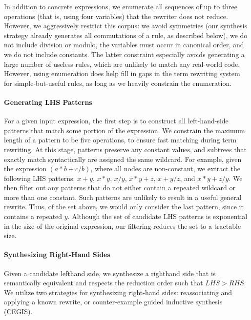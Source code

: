 \documentclass[sigplan,10pt,review,anonymous]{acmart}\settopmatter{printfolios=true,printccs=false,printacmref=false}
\begin{document}
In addition to concrete expressions, we enumerate all sequences of up to three operations (that is,
using four variables) that the rewriter does not reduce.  However, we aggressively restrict
this corpus: we avoid symmetries (our synthesis strategy already generates all commutations
of a rule, as described below), we do not include division or modulo, the variables must occur
in canonical order, and we do not include constants. The latter constraint
especially avoids generating a large number of useless rules, which are unlikely to
match any real-world code. However, using enumeration does help fill in gaps in the term
rewriting system for simple-but-useful rules, as long as we heavily constrain the enumeration.

\paragraph{Generating LHS Patterns} For a given input expression, the first step
is to construct all left-hand-side patterns that match some portion of the expression.
We constrain the maximum length of a pattern to be five operations, to ensure fast matching
during term rewriting. At this stage, patterns preserve any constant values, and subtrees
that exactly match syntactically are assigned the same wildcard. For
example, given the expression $(a*b + c/b)$, where all nodes are non-constant,
we extract the following LHS patterns: $x + y$, $x * y$, $x / y$, $x * y + z$,
$x + y/z$, and $x*y + z/y$.  We then filter out any patterns that do not either contain
a repeated wildcard or more than one constant. Such patterns are unlikely to result in a useful general
rewrite.  Thus, of the set above, we would only consider the last pattern, since
it contains a repeated $y$.  Although the set of candidate LHS patterns is exponential
in the size of the original expression, our filtering reduces the set to a tractable
size.

\paragraph{Synthesizing Right-Hand Sides} Given a candidate lefthand side, we 
synthesize a righthand side that is semantically equivalent and respects the reduction
order such that $\mathit{LHS} > \mathit{RHS}$.  We utilize two strategies for synthesizing
right-hand sides: reassociating and applying a known rewrite, or counter-example guided
inductive synthesis (CEGIS).
\end{document}
